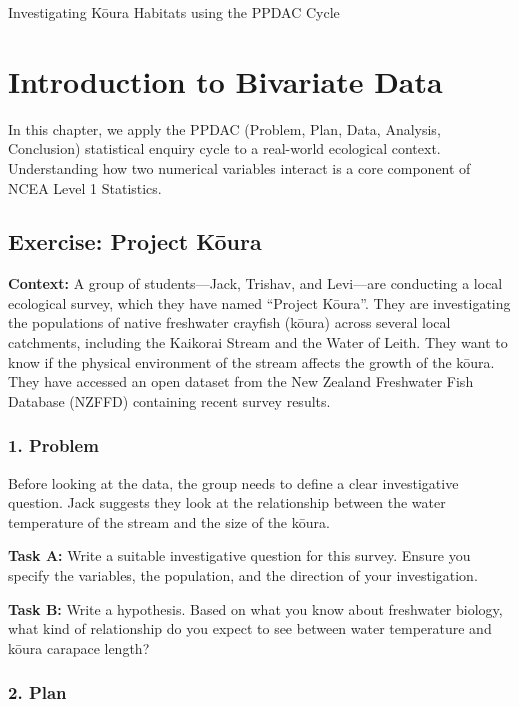 \documentclass[
  11pt,
  a4paper,
  oneside,
  open=any]{scrbook}
\begin{document}
Investigating Kōura Habitats using the PPDAC Cycle

\hfill\break


\chapter{Introduction to Bivariate
Data}\label{introduction-to-bivariate-data}

In this chapter, we apply the PPDAC (Problem, Plan, Data, Analysis,
Conclusion) statistical enquiry cycle to a real-world ecological
context. Understanding how two numerical variables interact is a core
component of NCEA Level 1 Statistics.

\section{Exercise: Project Kōura}\label{exercise-project-kux14dura}

\textbf{Context:} A group of students---Jack, Trishav, and Levi---are
conducting a local ecological survey, which they have named ``Project
Kōura''. They are investigating the populations of native freshwater
crayfish (kōura) across several local catchments, including the Kaikorai
Stream and the Water of Leith. They want to know if the physical
environment of the stream affects the growth of the kōura. They have
accessed an open dataset from the New Zealand Freshwater Fish Database
(NZFFD) containing recent survey results.

\subsection{1. Problem}\label{problem}

Before looking at the data, the group needs to define a clear
investigative question. Jack suggests they look at the relationship
between the water temperature of the stream and the size of the kōura.

\textbf{Task A:} Write a suitable investigative question for this
survey. Ensure you specify the variables, the population, and the
direction of your investigation.

\textbf{Task B:} Write a hypothesis. Based on what you know about
freshwater biology, what kind of relationship do you expect to see
between water temperature and kōura carapace length?

\subsection{2. Plan}\label{plan}
\end{document}
